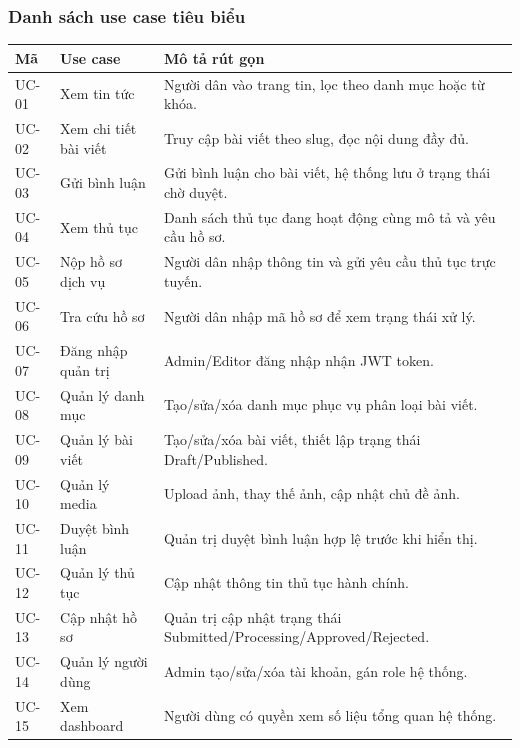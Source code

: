 \documentclass[12pt,a4paper]{article}
\begin{document}
\subsubsection{Danh sách use case tiêu biểu}
\begin{longtable}{p{2.4cm}p{4.3cm}p{7.1cm}}
\toprule
\textbf{Mã} & \textbf{Use case} & \textbf{Mô tả rút gọn} \\
\midrule
UC-01 & Xem tin tức & Người dân vào trang tin, lọc theo danh mục hoặc từ khóa. \\
UC-02 & Xem chi tiết bài viết & Truy cập bài viết theo slug, đọc nội dung đầy đủ. \\
UC-03 & Gửi bình luận & Gửi bình luận cho bài viết, hệ thống lưu ở trạng thái chờ duyệt. \\
UC-04 & Xem thủ tục & Danh sách thủ tục đang hoạt động cùng mô tả và yêu cầu hồ sơ. \\
UC-05 & Nộp hồ sơ dịch vụ & Người dân nhập thông tin và gửi yêu cầu thủ tục trực tuyến. \\
UC-06 & Tra cứu hồ sơ & Người dân nhập mã hồ sơ để xem trạng thái xử lý. \\
UC-07 & Đăng nhập quản trị & Admin/Editor đăng nhập nhận JWT token. \\
UC-08 & Quản lý danh mục & Tạo/sửa/xóa danh mục phục vụ phân loại bài viết. \\
UC-09 & Quản lý bài viết & Tạo/sửa/xóa bài viết, thiết lập trạng thái Draft/Published. \\
UC-10 & Quản lý media & Upload ảnh, thay thế ảnh, cập nhật chủ đề ảnh. \\
UC-11 & Duyệt bình luận & Quản trị duyệt bình luận hợp lệ trước khi hiển thị. \\
UC-12 & Quản lý thủ tục & Cập nhật thông tin thủ tục hành chính. \\
UC-13 & Cập nhật hồ sơ & Quản trị cập nhật trạng thái Submitted/Processing/Approved/Rejected. \\
UC-14 & Quản lý người dùng & Admin tạo/sửa/xóa tài khoản, gán role hệ thống. \\
UC-15 & Xem dashboard & Người dùng có quyền xem số liệu tổng quan hệ thống. \\
\bottomrule
\end{longtable}
\end{document}
